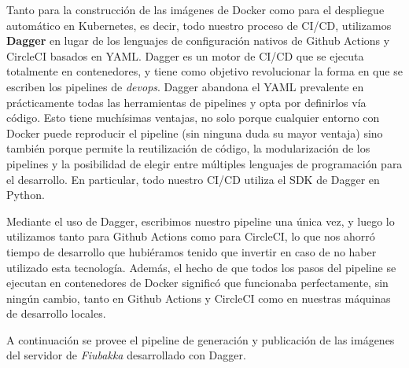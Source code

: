 Tanto para la construcción de las imágenes de Docker como para el despliegue automático en Kubernetes, es decir, todo nuestro proceso de CI/CD, utilizamos \textbf{Dagger} en lugar de los lenguajes de configuración nativos
de Github Actions y CircleCI basados en YAML. Dagger es un motor de CI/CD que se ejecuta totalmente en contenedores, y tiene como objetivo revolucionar la forma en que se escriben los pipelines de \textit{devops}.
Dagger abandona el YAML prevalente en prácticamente todas las herramientas de pipelines y opta por definirlos vía código. Esto tiene muchísimas ventajas, no solo porque cualquier entorno con Docker puede reproducir el pipeline
(sin ninguna duda su mayor ventaja) sino también porque permite la reutilización de código, la modularización de los pipelines y la posibilidad de elegir entre múltiples lenguajes de programación para el desarrollo. En particular, todo nuestro
CI/CD utiliza el SDK de Dagger en Python.

Mediante el uso de Dagger, escribimos nuestro pipeline una única vez, y luego lo utilizamos tanto para Github Actions como para CircleCI, lo que nos ahorró tiempo de desarrollo que hubiéramos tenido que invertir en caso de no haber utilizado esta tecnología.
Además, el hecho de que todos los pasos del pipeline se ejecutan en contenedores de Docker significó que funcionaba perfectamente, sin ningún cambio, tanto en Github Actions y CircleCI como en nuestras máquinas de desarrollo locales.

A continuación se provee el pipeline de generación y publicación de las imágenes del servidor de \textit{Fiubakka} desarrollado con Dagger.


